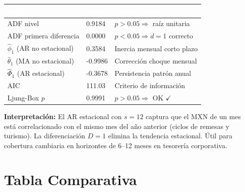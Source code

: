 \documentclass[12pt,letterpaper]{article}
\begin{document}
\begin{center}
\renewcommand{\arraystretch}{1.3}
\begin{tabular}{@{}L{3.8cm}L{2.6cm}L{4.0cm}@{}}
\toprule
{}\textcolor{white}{\textbf{Métrica}} &
\textcolor{white}{\textbf{Valor}} &
\textcolor{white}{\textbf{Interpretación}} \\
\midrule
{} ADF nivel & 0.9184 & $p>0.05 \Rightarrow$ raíz unitaria \\
ADF primera diferencia & 0.0000 & $p<0.05 \Rightarrow d=1$ correcto \\
 $\hat\phi_1$ (AR no estacional) & 0.3584 & Inercia mensual corto plazo \\
$\hat\theta_1$ (MA no estacional) & -0.9986 & Corrección choque mensual \\
 $\hat\Phi_1$ (AR estacional) & -0.3678 & Persistencia patrón anual \\
AIC & 111.03 & Criterio de información \\
 Ljung-Box $p$ & 0.9991 & $p>0.05 \Rightarrow$ OK $\checkmark$ \\
\bottomrule
\end{tabular}
\end{center}

\textbf{Interpretación:} El AR estacional con $s=12$ captura que el MXN de un mes está
correlacionado con el mismo mes del año anterior (ciclos de remesas y turismo).
La diferenciación $D=1$ elimina la tendencia estacional. Útil para cobertura cambiaria
en horizontes de 6--12 meses en tesorería corporativa.

\section{Tabla Comparativa}
\end{document}
